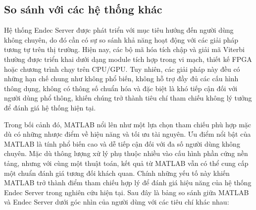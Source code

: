 \documentclass[../DoAn.tex]{subfiles}
\begin{document}
\subsection{So sánh với các hệ thống khác}

Hệ thống Endec Server được phát triển với mục tiêu hướng đến người dùng không chuyên, do đó cần có sự so sánh khả năng hoạt động với các giải pháp tương tự trên thị trường. Hiện nay, các bộ mã hóa tích chập và giải mã Viterbi thường được triển khai dưới dạng module tích hợp trong vi mạch, thiết kế FPGA hoặc chương trình chạy trên CPU/GPU. Tuy nhiên, các giải pháp này đều có những hạn chế chung như không phổ biến, không hỗ trợ đầy đủ các cấu hình thông dụng, không có thông số chuẩn hóa và đặc biệt là khó tiếp cận đối với người dùng phổ thông, khiến chúng trở thành tiêu chí tham chiếu không lý tưởng để đánh giá hệ thống hiện tại.

Trong bối cảnh đó, MATLAB nổi lên như một lựa chọn tham chiếu phù hợp mặc dù có những nhược điểm về hiệu năng và tối ưu tài nguyên. Ưu điểm nổi bật của MATLAB là tính phổ biến cao và dễ tiếp cận đối với đa số người dùng không chuyên. Mặc dù thông lượng xử lý phụ thuộc nhiều vào cấu hình phần cứng nền tảng, nhưng với cùng một thuật toán, kết quả từ MATLAB vẫn có thể cung cấp một chuẩn đánh giá tương đối khách quan. Chính những yếu tố này khiến MATLAB trở thành điểm tham chiếu hợp lý để đánh giá hiệu năng của hệ thống Endec Server trong nghiên cứu hiện tại. Sau đây là bảng so sánh giữa MATLAB và Endec Server dưới góc nhìn của người dùng với các tiêu chí khác nhau: 
\end{document}
